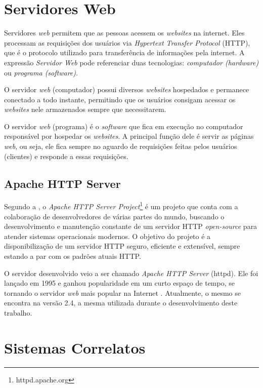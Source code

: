 \documentclass[
  12pt,       %
  openright,      %
  oneside,      %
  a4paper,      %
  english,      %
  french,        %
  spanish,     %
  brazil        %
  ]{abntex2-decsi}
\begin{document}
    \section{Servidores Web}

        Servidores \textit{web} permitem que as pessoas acessem os \textit{websites} na internet. Eles processam as requisições dos usuários via \textit{Hypertext Transfer Protocol} (HTTP), que é o protocolo utilizado para transferência de informações pela internet. A expressão \textit{Servidor Web} pode referenciar duas tecnologias: \textit{computador (hardware)} ou \textit{programa (software)}. 

        O servidor \textit{web} (computador) possui diversos \textit{websites} hospedados e permanece conectado a todo instante, permitindo que os usuários consigam acessar os \textit{websites} nele armazenados sempre que necessitarem.  

        O servidor \textit{web} (programa) é o \textit{software} que fica em execução no computador responsável por hospedar os \textit{websites}. A principal função dele é servir as páginas \textit{web}, ou seja, ele fica sempre no aguardo de requisições feitas pelos usuários (clientes) e responde a essas requisições.

        \subsection{Apache HTTP Server}

        Segundo a , o \textit{Apache HTTP Server Project}\footnote{httpd.apache.org} é um projeto que conta com a colaboração de desenvolvedores de  várias partes do mundo, buscando o desenvolvimento e manutenção constante de um servidor HTTP \textit{open-source} para atender sistemas operacionais modernos. O objetivo do projeto é a disponibilização de um servidor HTTP seguro, eficiente e extensível, sempre estando a par com os padrões atuais HTTP. 

       O servidor desenvolvido veio a ser chamado \textit{Apache HTTP Server} (httpd). Ele foi lançado em 1995 e ganhou popularidade em um curto espaço de tempo, se tornando o servidor \textit{web} mais popular na Internet \cite{aboutapache:2016}. Atualmente, o mesmo se encontra na versão 2.4, a mesma utilizada durante o desenvolvimento deste trabalho. 

    \section{Sistemas Correlatos}
\end{document}
